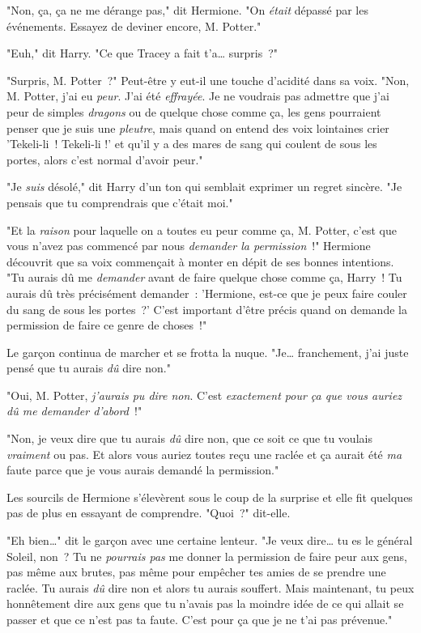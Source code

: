 "Non, ça, ça ne me dérange pas," dit Hermione. "On \emph{était} dépassé par les événements. Essayez de deviner encore, M. Potter."

"Euh," dit Harry. "Ce que Tracey a fait t'a… surpris~?"

"Surpris, M. Potter~?" Peut-être y eut-il une touche d'acidité dans sa voix. "Non, M. Potter, j'ai eu \emph{peur}. J'ai été \emph{effrayée}. Je ne voudrais pas admettre que j'ai peur de simples \emph{dragons} ou de quelque chose comme ça, les gens pourraient penser que je suis une \emph{pleutre}, mais quand on entend des voix lointaines crier 'Tekeli-li~! Tekeli-li !' et qu'il y a des mares de sang qui coulent de sous les portes, alors c'est normal d'avoir peur."

"Je \emph{suis} désolé," dit Harry d'un ton qui semblait exprimer un regret sincère. "Je pensais que tu comprendrais que c'était moi."

"Et la \emph{raison} pour laquelle on a toutes eu peur comme ça, M. Potter, c'est que vous n'avez pas commencé par nous \emph{demander la permission}~!" Hermione découvrit que sa voix commençait à monter en dépit de ses bonnes intentions. "Tu aurais dû me \emph{demander} avant de faire quelque chose comme ça, Harry~! Tu aurais dû très précisément demander~: 'Hermione, est-ce que je peux faire couler du sang de sous les portes~?' C'est important d'être précis quand on demande la permission de faire ce genre de choses~!"

Le garçon continua de marcher et se frotta la nuque. "Je… franchement, j'ai juste pensé que tu aurais \emph{dû} dire non."

"Oui, M. Potter, \emph{j'aurais pu dire non}. C'est \emph{exactement pour ça que vous auriez dû me demander d'abord}~!"

"Non, je veux dire que tu aurais \emph{dû} dire non, que ce soit ce que tu voulais \emph{vraiment} ou pas. Et alors vous auriez toutes reçu une raclée et ça aurait été \emph{ma} faute parce que je vous aurais demandé la permission."

Les sourcils de Hermione s'élevèrent sous le coup de la surprise et elle fit quelques pas de plus en essayant de comprendre. "Quoi~?" dit-elle.

"Eh bien…" dit le garçon avec une certaine lenteur. "Je veux dire… tu es le général Soleil, non~? Tu ne \emph{pourrais pas} me donner la permission de faire peur aux gens, pas même aux brutes, pas même pour empêcher tes amies de se prendre une raclée. Tu aurais \emph{dû} dire non et alors tu aurais souffert. Mais maintenant, tu peux honnêtement dire aux gens que tu n'avais pas la moindre idée de ce qui allait se passer et que ce n'est pas ta faute. C'est pour ça que je ne t'ai pas prévenue."


